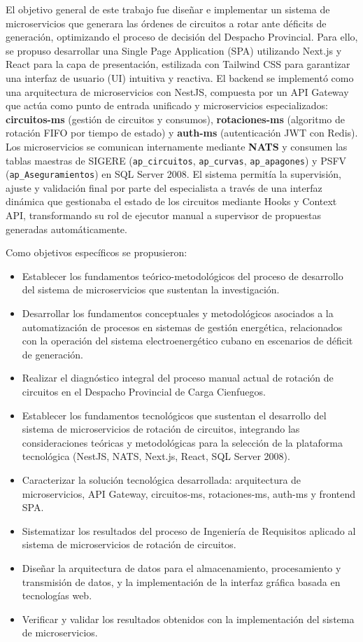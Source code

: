 El objetivo general de este trabajo fue diseñar e implementar un sistema de microservicios que generara las órdenes de circuitos a rotar ante déficits de generación, optimizando el proceso de decisión del Despacho Provincial. Para ello, se propuso desarrollar una Single Page Application (SPA) utilizando Next.js y React para la capa de presentación, estilizada con Tailwind CSS para garantizar una interfaz de usuario (UI) intuitiva y reactiva. El backend se implementó como una arquitectura de microservicios con NestJS, compuesta por un API Gateway que actúa como punto de entrada unificado y microservicios especializados: \textbf{circuitos-ms} (gestión de circuitos y consumos), \textbf{rotaciones-ms} (algoritmo de rotación FIFO por tiempo de estado) y \textbf{auth-ms} (autenticación JWT con Redis). Los microservicios se comunican internamente mediante \textbf{NATS} y consumen las tablas maestras de SIGERE (\texttt{ap\_circuitos}, \texttt{ap\_curvas}, \texttt{ap\_apagones}) y PSFV (\texttt{ap\_Aseguramientos}) en SQL Server 2008. El sistema permitía la supervisión, ajuste y validación final por parte del especialista a través de una interfaz dinámica que gestionaba el estado de los circuitos mediante Hooks y Context API, transformando su rol de ejecutor manual a supervisor de propuestas generadas automáticamente.

Como objetivos específicos se propusieron:
\begin{itemize}
    \item Establecer los fundamentos teórico-metodológicos del proceso de desarrollo del sistema de microservicios que sustentan la investigación.
    \item Desarrollar los fundamentos conceptuales y metodológicos asociados a la automatización de procesos en sistemas de gestión energética, relacionados con la operación del sistema electroenergético cubano en escenarios de déficit de generación.
    \item Realizar el diagnóstico integral del proceso manual actual de rotación de circuitos en el Despacho Provincial de Carga Cienfuegos.
    \item Establecer los fundamentos tecnológicos que sustentan el desarrollo del sistema de microservicios de rotación de circuitos, integrando las consideraciones teóricas y metodológicas para la selección de la plataforma tecnológica (NestJS, NATS, Next.js, React, SQL Server 2008).
    \item Caracterizar la solución tecnológica desarrollada: arquitectura de microservicios, API Gateway, circuitos-ms, rotaciones-ms, auth-ms y frontend SPA.
    \item Sistematizar los resultados del proceso de Ingeniería de Requisitos aplicado al sistema de microservicios de rotación de circuitos.
    \item Diseñar la arquitectura de datos para el almacenamiento, procesamiento y transmisión de datos, y la implementación de la interfaz gráfica basada en tecnologías web.
    \item Verificar y validar los resultados obtenidos con la implementación del sistema de microservicios.
\end{itemize}

